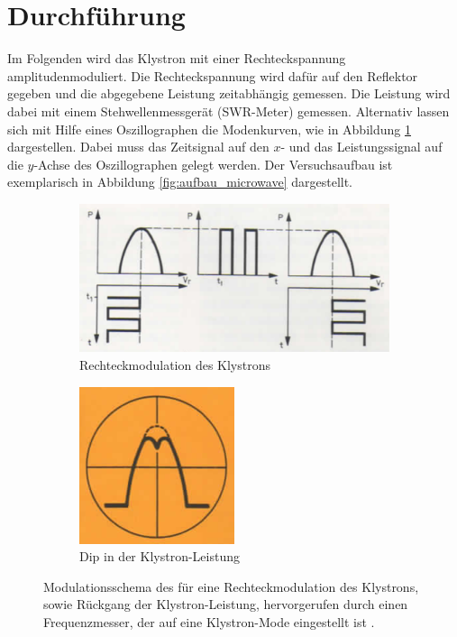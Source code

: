 \section{Durchführung}
Im Folgenden wird das Klystron mit einer Rechteckspannung amplitudenmoduliert.
Die Rechteckspannung wird dafür auf den Reflektor gegeben und die abgegebene
Leistung zeitabhängig gemessen.
Die Leistung wird dabei mit einem Stehwellenmessgerät (SWR-Meter) gemessen.
Alternativ lassen sich mit Hilfe eines Oszillographen die Modenkurven, wie in
Abbildung \ref{fig:moden} dargestellen.
Dabei muss das Zeitsignal auf den $x$- und das Leistungssignal auf die
$y$-Achse des Oszillographen gelegt werden.
Der Versuchsaufbau ist exemplarisch in Abbildung \ref{fig:aufbau_microwave}
dargestellt.
\begin{figure}[p]
    \centering
    \begin{subfigure}{0.6\linewidth}
        \centering
        \includegraphics[width=0.8\linewidth]{img/moden.png}
        \caption{
            Rechteckmodulation des Klystrons
        }
        \label{fig:moden}
    \end{subfigure}
    \begin{subfigure}{0.39\linewidth}
        \centering
        \includegraphics[width=0.8\linewidth]{img/dip.png}
        \caption{
            Dip in der Klystron-Leistung
        }
        \label{fig:dip}
    \end{subfigure}
    \caption{
        Modulationsschema des für eine Rechteckmodulation des Klystrons,
        sowie Rückgang der Klystron-Leistung, hervorgerufen durch einen
        Frequenzmesser, der auf eine Klystron-Mode eingestellt ist
        \cite{V53}.
    }
    \label{fig:moden-dip}
\end{figure}
